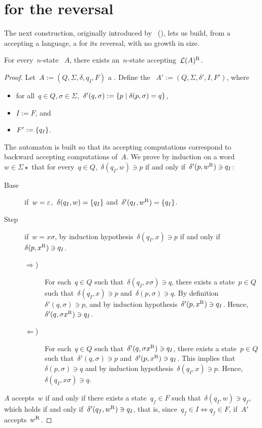 \section{\texorpdfstring{\ONFA}{1NFA} for the reversal}\label{sub:reversal}
The next construction, originally introduced by~\citeauthor{RabSco59} (\cite{RabSco59}), lets us build, from a \ONFA accepting a language, a \ONFA for its reversal, with no growth in size.
\begin{thrm}
	For every~$n$-state \ONFA~$A$, there exists an~$n$-state \ONFA accepting~$\mathcal L(A)^{\mathrm R}$.
\end{thrm}
\begin{proof}
	Let~$A:=(Q,\Sigma,\delta,q_I,F)$ a \ONFA.
	Define the \ONFA~$A':=(Q,\Sigma,\delta',I,F')$, where
	\begin{itemize}
		\item for all~$q\in Q,\sigma\in\Sigma$,~$\delta'(q,\sigma):=\{p \mid \delta(p,\sigma)=q\}$,
		\item $I:=F$, and
		\item $F':=\{q_I\}$.
	\end{itemize}
	The automaton is built so that its accepting computations correspond to backward accepting computations of~$A$.
	We prove by induction on a word~$w\in\Sigma\star$ that for every~$q\in Q$,~$\delta(q_I,w)\ni p$ if and only if~$\delta'(p,w^{\mathrm R})\ni q_I$:
	\begin{description}
		\item[Base] if~$w=\varepsilon$,~$\delta(q_I,w)=\{q_I\}$ and~$\delta'(q_I,w^{\mathrm R})=\{q_I\}$.
		\item[Step] if~$w=x\sigma$, by induction hypothesis~$\delta(q_I,x)\ni p$ if and only if~$\delta(p,x^{\mathrm R})\ni q_I$.
		      \begin{description}
			      \item[$\Rightarrow$)] For each~$q\in Q$ such that~$\delta(q_I,x\sigma)\ni q$, there exists a state~$p\in Q$ such that~$\delta(q_I,x)\ni p$ and~$\delta(p,\sigma)\ni q$.
			            By definition~$\delta'(q,\sigma)\ni p$, and by induction hypothesis~$\delta'(p,x^{\mathrm R})\ni q_I$. Hence,~$\delta'(q,\sigma x^{\mathrm R})\ni q_I$.
			      \item[$\Leftarrow$)] For each~$q\in Q$ such that~$\delta'(q,\sigma x^{\mathrm R})\ni q_I$, there exists a state~$p\in Q$ such that~$\delta'(q,\sigma)\ni p$ and~$\delta'(p,x^{\mathrm R})\ni q_I$.
			            This implies that $\delta(p,\sigma)\ni q$ and by induction hypothesis~$\delta(q_I,x)\ni p$. Hence, $\delta(q_I,x\sigma)\ni q$.
		      \end{description}
	\end{description}
	$A$ accepts~$w$ if and only if there exists a state~$q_f\in F$ such that~$\delta(q_I,w)\ni q_f$, which holds if and only if~$\delta'(q_f,w^{\mathrm R})\ni q_I$, that is, since~$q_f\in I\iff q_f\in F$, if~$A'$ accepts~$w^{\mathrm R}$.
\end{proof}
